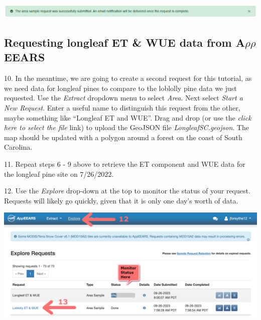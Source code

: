 \documentclass[oneside,a4paper,11pt,explicit]{book}
\begin{document}
\vspace{.5em}

\centerline{\includegraphics[width=\textwidth]{RequestSuccess.png}}

\subsection{Requesting longleaf ET \& WUE data from A$\rho\rho$EEARS}

10. In the meantime, we are going to create a second request for this tutorial, as we need data for longleaf pines to compare to the loblolly pine data we just requested. Use the \textit{Extract} dropdown menu to select \textit{Area}. Next select \textit{Start a New Request}.  Enter a useful name to distinguish this request from the other, maybe something like ``Longleaf ET and WUE''. Drag and drop (or use the \textit{click here to select the file} link) to upload the GeoJSON file \textit{LongleafSC.geojson}. The map should be updated with a polygon around a forest on the coast of South Carolina.

11. Repeat steps 6 - 9 above to retrieve the ET component and WUE data for the longleaf pine site on 7/26/2022.




12. Use the \textit{Explore} drop-down at the top to monitor the status of your request. Requests will likely go quickly, given that it is only one day's worth of data.

\vspace{.5em}

\centerline{\includegraphics[width=.75\textwidth]{ExploreComplete.png}}

\vspace{.5em}
\end{document}
